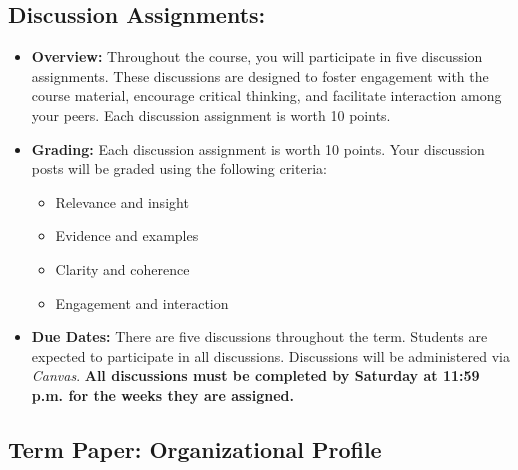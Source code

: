 \documentclass[11pt, letterpaper]{article}
\begin{document}
\subsection*{Discussion Assignments:}
    \begin{itemize}
        \item \textbf{Overview:} Throughout the course, you will participate in five discussion assignments. These discussions are designed to foster engagement with the course material, encourage critical thinking, and facilitate interaction among your peers. Each discussion assignment is worth 10 points.
        \item \textbf{Grading:} Each discussion assignment is worth 10 points. Your discussion posts will be graded using the following criteria:
            \begin{itemize}
                \item Relevance and insight
                \item Evidence and examples
                \item Clarity and coherence
                \item Engagement and interaction
            \end{itemize}
        \item \textbf{Due Dates:} There are five discussions throughout the term. Students are expected to participate in all discussions. Discussions will be administered via \emph{Canvas}. \textbf{All discussions must be completed by Saturday at 11:59 p.m. for the weeks they are assigned.}
    \end{itemize}

\subsection*{Term Paper: Organizational Profile}
\end{document}

